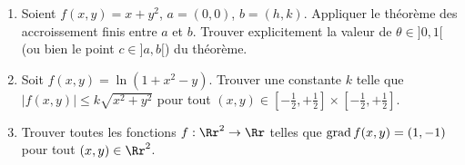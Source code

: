 \documentclass[11pt, class=report,crop=false]{standalone}
\begin{document}
\begin{miniexercices}
\sauteligne
\begin{enumerate}

  \item Soient $f(x,y) = x + y^2$, $a=(0,0)$, $b=(h,k)$. 
  Appliquer le théorème des accroissement finis entre $a$ et $b$. Trouver explicitement la valeur de $\theta \in {}]0,1[$ (ou bien le point $c \in {}]a,b[$) du théorème.
  
  \item Soit $f(x,y) = \ln (1+x^2-y)$. Trouver une constante $k$ telle que $| f(x,y) | \le k \sqrt{x^2+y^2}$ pour tout $(x,y) \in [-\frac12,+\frac12]\times [-\frac12,+\frac12]$.

  \item Trouver toutes les fonctions $f : \Rr^2 \to \Rr$ telles que $\operatorname{grad} f (x,y) = (1,-1)$ pour tout $(x,y) \in \Rr^2$. 
  
\end{enumerate}
\end{miniexercices}




\finchapitre 
\end{document}
